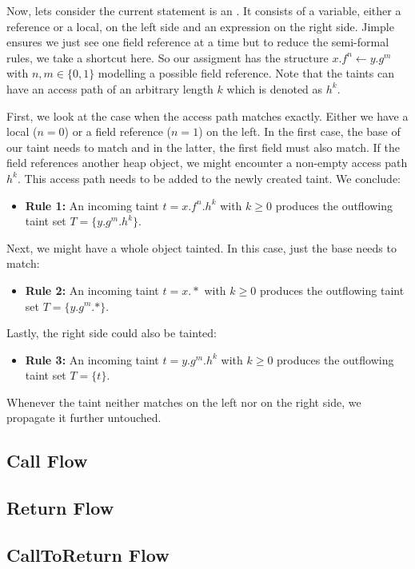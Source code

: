 \documentclass[../draft.tex]{subfiles}
\begin{document}
    Now, lets consider the current statement is an . It consists of a variable, either a reference or a local, on the left side and an expression on the right side. Jimple ensures we just see one field reference at a time but to reduce the semi-formal rules, we take a shortcut here. So our assigment has the structure $x.f^n \leftarrow y.g^m$ with $n,m \in \{0,1\}$ modelling a possible field reference. Note that the taints can have an access path of an arbitrary length $k$ which is denoted as $h^k$.

    First, we look at the case when the access path matches exactly. Either we have a local ($n=0$) or a field reference ($n=1$) on the left. In the first case, the base of our taint needs to match and in the latter, the first field must also match. If the field references another heap object, we might encounter a non-empty access path $h^k$. This access path needs to be added to the newly created taint. We conclude:
    \begin{itemize}
        \item[] \textbf{Rule 1:} An incoming taint $t = x.f^n.h^k$ with $k \geq 0$ produces the outflowing taint set $T = \{y.g^m.h^k\}$.
    \end{itemize} 

    Next, we might have a whole object tainted. In this case, just the base needs to match:
    \begin{itemize}
        \item[] \textbf{Rule 2:} An incoming taint $t = x.*$ with $k \geq 0$ produces the outflowing taint set $T = \{y.g^m.*\}$.
    \end{itemize} 

    Lastly, the right side could also be tainted:
    \begin{itemize}
        \item[] \textbf{Rule 3:} An incoming taint $t = y.g^m.h^k$ with $k \geq 0$ produces the outflowing taint set $T = \{t\}$.
    \end{itemize}


    Whenever the taint neither matches on the left nor on the right side, we propagate it further untouched.

    \subsection{Call Flow}
    

    \subsection{Return Flow}

    \subsection{CallToReturn Flow}
\end{document}
